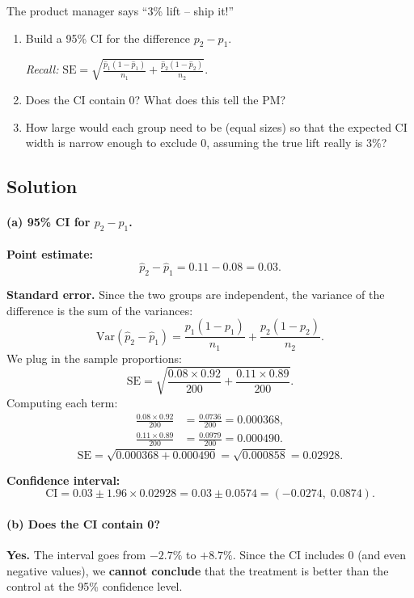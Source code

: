 \documentclass[11pt]{article}
\begin{document}
The product manager says ``3\% lift -- ship it!''

\begin{enumerate}[label=\alph*)]
  \item Build a 95\% CI for the difference $p_2 - p_1$.

  \emph{Recall:} $\text{SE} = \sqrt{\frac{\hat{p}_1(1-\hat{p}_1)}{n_1} + \frac{\hat{p}_2(1-\hat{p}_2)}{n_2}}$.
  \item Does the CI contain 0? What does this tell the PM?
  \item How large would each group need to be (equal sizes) so that the expected CI width is narrow enough to exclude 0, assuming the true lift really is 3\%?
\end{enumerate}

\subsection*{Solution}

\paragraph{(a) 95\% CI for $p_2 - p_1$.}

\textbf{Point estimate:}
\[
  \hat{p}_2 - \hat{p}_1 = 0.11 - 0.08 = 0.03.
\]

\textbf{Standard error.} Since the two groups are independent, the variance of the difference is the sum of the variances:
\[
  \text{Var}(\hat{p}_2 - \hat{p}_1)
  = \frac{p_1(1-p_1)}{n_1} + \frac{p_2(1-p_2)}{n_2}.
\]
We plug in the sample proportions:
\[
  \text{SE} = \sqrt{\frac{0.08 \times 0.92}{200} + \frac{0.11 \times 0.89}{200}}.
\]
Computing each term:
\begin{align*}
  \frac{0.08 \times 0.92}{200} &= \frac{0.0736}{200} = 0.000368, \\[4pt]
  \frac{0.11 \times 0.89}{200} &= \frac{0.0979}{200} = 0.000490.
\end{align*}
\[
  \text{SE} = \sqrt{0.000368 + 0.000490} = \sqrt{0.000858} = 0.02928.
\]

\textbf{Confidence interval:}
\[
  \text{CI} = 0.03 \pm 1.96 \times 0.02928 = 0.03 \pm 0.0574 = \boxed{(-0.0274,\; 0.0874)}.
\]

\paragraph{(b) Does the CI contain 0?}

\textbf{Yes.} The interval goes from $-2.7\%$ to $+8.7\%$. Since the CI includes 0 (and even negative values), we \textbf{cannot conclude} that the treatment is better than the control at the 95\% confidence level.
\end{document}
